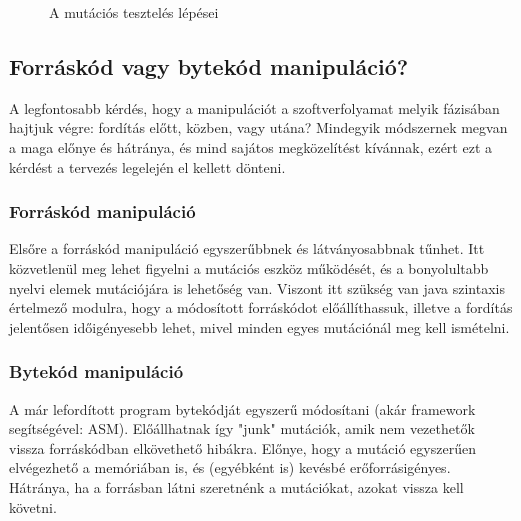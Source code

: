 \begin{figure}
\centering
{}

\caption{A mutációs tesztelés lépései} \label{fig:steps}
\end{figure}

\subsection{Forráskód vagy bytekód manipuláció?}
A legfontosabb kérdés, hogy a manipulációt a szoftverfolyamat melyik fázisában hajtjuk végre: fordítás előtt, közben, vagy utána? Mindegyik módszernek megvan a maga előnye és hátránya, és mind sajátos megközelítést kívánnak, ezért ezt a kérdést a tervezés legelején el kellett dönteni.
\subsubsection{Forráskód manipuláció}
Elsőre a forráskód manipuláció egyszerűbbnek és látványosabbnak tűnhet. Itt közvetlenül meg lehet figyelni a mutációs eszköz működését, és a bonyolultabb nyelvi elemek mutációjára is lehetőség van. Viszont itt szükség van java szintaxis értelmező modulra, hogy a módosított forráskódot előállíthassuk, illetve a fordítás jelentősen időigényesebb lehet, mivel minden egyes mutációnál meg kell ismételni.
\subsubsection{Bytekód manipuláció}
A már lefordított program bytekódját egyszerű módosítani (akár framework segítségével: ASM). Előállhatnak így "junk" mutációk, amik nem vezethetők vissza forráskódban elkövethető hibákra. Előnye, hogy a mutáció egyszerűen elvégezhető a memóriában is, és (egyébként is) kevésbé erőforrásigényes. Hátránya, ha a forrásban látni szeretnénk a mutációkat, azokat vissza kell követni.
